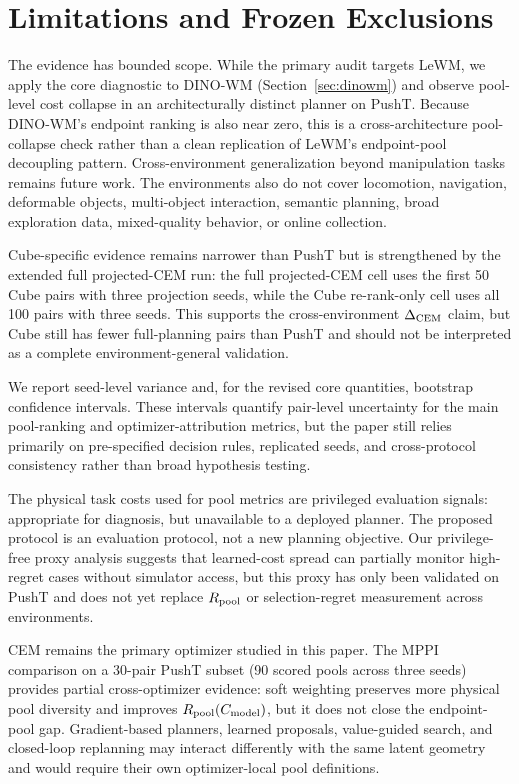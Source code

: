 \section{Limitations and Frozen Exclusions}

The evidence has bounded scope. While the primary audit targets LeWM, we apply the core diagnostic to DINO-WM (Section~\ref{sec:dinowm}) and observe pool-level cost collapse in an architecturally distinct planner on PushT. Because DINO-WM's endpoint ranking is also near zero, this is a cross-architecture pool-collapse check rather than a clean replication of LeWM's endpoint-pool decoupling pattern. Cross-environment generalization beyond manipulation tasks remains future work. The environments also do not cover locomotion, navigation, deformable objects, multi-object interaction, semantic planning, broad exploration data, mixed-quality behavior, or online collection.

Cube-specific evidence remains narrower than PushT but is strengthened by the extended full projected-CEM run: the full projected-CEM cell uses the first 50 Cube pairs with three projection seeds, while the Cube re-rank-only cell uses all 100 pairs with three seeds. This supports the cross-environment $\Delta_\text{CEM}$ claim, but Cube still has fewer full-planning pairs than PushT and should not be interpreted as a complete environment-general validation.

We report seed-level variance and, for the revised core quantities, bootstrap confidence intervals. These intervals quantify pair-level uncertainty for the main pool-ranking and optimizer-attribution metrics, but the paper still relies primarily on pre-specified decision rules, replicated seeds, and cross-protocol consistency rather than broad hypothesis testing.

The physical task costs used for pool metrics are privileged evaluation signals: appropriate for diagnosis, but unavailable to a deployed planner. The proposed protocol is an evaluation protocol, not a new planning objective. Our privilege-free proxy analysis suggests that learned-cost spread can partially monitor high-regret cases without simulator access, but this proxy has only been validated on PushT and does not yet replace $R_\text{pool}$ or selection-regret measurement across environments.

CEM remains the primary optimizer studied in this paper. The MPPI comparison on a 30-pair PushT subset (90 scored pools across three seeds) provides partial cross-optimizer evidence: soft weighting preserves more physical pool diversity and improves $R_\text{pool}(C_\text{model})$, but it does not close the endpoint-pool gap. Gradient-based planners, learned proposals, value-guided search, and closed-loop replanning may interact differently with the same latent geometry and would require their own optimizer-local pool definitions.

